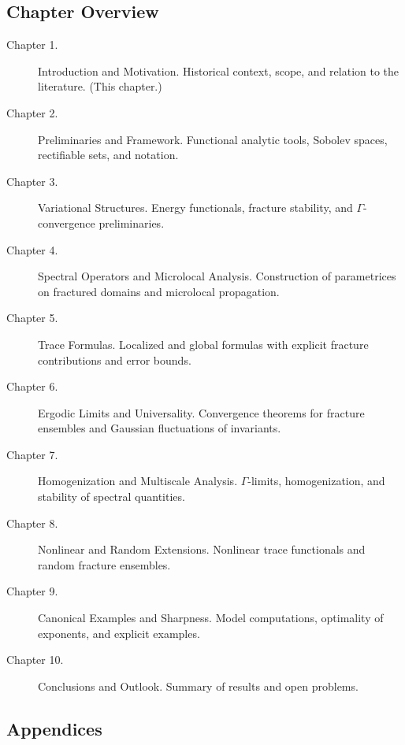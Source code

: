 \subsection*{Chapter Overview}

\begin{description}
    \item[Chapter 1.] Introduction and Motivation. Historical context, scope, 
    and relation to the literature. (This chapter.)
    \item[Chapter 2.] Preliminaries and Framework. Functional analytic tools, 
    Sobolev spaces, rectifiable sets, and notation.
    \item[Chapter 3.] Variational Structures. Energy functionals, fracture 
    stability, and $\Gamma$-convergence preliminaries.
    \item[Chapter 4.] Spectral Operators and Microlocal Analysis. Construction 
    of parametrices on fractured domains and microlocal propagation.
    \item[Chapter 5.] Trace Formulas. Localized and global formulas with 
    explicit fracture contributions and error bounds.
    \item[Chapter 6.] Ergodic Limits and Universality. Convergence theorems for 
    fracture ensembles and Gaussian fluctuations of invariants.
    \item[Chapter 7.] Homogenization and Multiscale Analysis. $\Gamma$-limits, 
    homogenization, and stability of spectral quantities.
    \item[Chapter 8.] Nonlinear and Random Extensions. Nonlinear trace 
    functionals and random fracture ensembles.
    \item[Chapter 9.] Canonical Examples and Sharpness. Model computations, 
    optimality of exponents, and explicit examples.
    \item[Chapter 10.] Conclusions and Outlook. Summary of results and open 
    problems.
\end{description}

\subsection*{Appendices}

